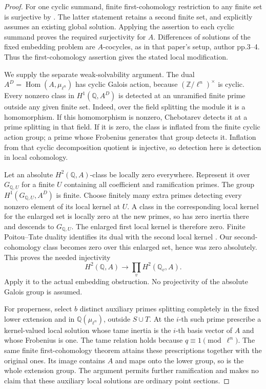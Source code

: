 \begin{proof}
For one cyclic summand, finite first-cohomology restriction
to any finite set is surjective by
\citet[Theorem 2.1(e), author p.4; Corollary 2.3,
author p.6]{CohNeftin2013}. The latter statement retains
a second finite set, and explicitly assumes an existing
global solution. Applying the assertion to each cyclic
summand proves the required surjectivity for \(A\).
Differences of solutions of the fixed embedding problem
are \(A\)-cocycles, as in that paper's setup,
author pp.3--4. Thus the first-cohomology assertion gives
the stated local modification.

We supply the separate weak-solvability argument.
The dual \(A^D=\operatorname{Hom}(A,\mu_{\ell^n})\)
has cyclic Galois action, because
\((\mathbb Z/\ell^n)^\times\) is cyclic.
Every nonzero class in \(H^1(\mathbb Q,A^D)\)
is detected at an unramified finite prime outside any
given finite set. Indeed, over the field splitting
the module it is a homomorphism. If this homomorphism
is nonzero, Chebotarev detects it at a prime splitting
in that field. If it is zero, the class is inflated
from the finite cyclic action group; a prime whose
Frobenius generates that group detects it.
Inflation from that cyclic decomposition quotient is
injective, so detection here is detection in local
cohomology.

Let an absolute \(H^2(\mathbb Q,A)\)-class be locally
zero everywhere. Represent it over \(G_{\mathbb Q,U}\)
for a finite \(U\) containing all coefficient and
ramification primes. The group \(H^1(G_{\mathbb Q,U},A^D)\)
is finite. Choose finitely many extra primes detecting
every nonzero element of its local kernel at \(U\).
A class in the corresponding local kernel for the
enlarged set is locally zero at the new primes,
so has zero inertia there and descends to \(G_{\mathbb Q,U}\).
The enlarged first local kernel is therefore zero.
Finite Poitou--Tate duality identifies its dual with
the second local kernel
\citep[I.4.10]{CohMilneADT}. Our second-cohomology
class becomes zero over this enlarged set, hence was
zero absolutely. This proves the needed injectivity
\[
 H^2(\mathbb Q,A)\longrightarrow
                         \prod_v H^2(\mathbb Q_v,A).
\]
Apply it to the actual embedding obstruction. No
projectivity of the absolute Galois group is assumed.

For properness, select \(b\) distinct auxiliary primes
splitting completely in the fixed lower extension
and in \(\mathbb Q(\mu_{\ell^n})\), outside \(S\cup T\).
At the \(i\)-th such prime prescribe a kernel-valued
local solution whose tame inertia is the \(i\)-th
basis vector of \(A\) and whose Frobenius is one.
The tame relation holds because \(q\equiv1\pmod{\ell^n}\).
The same finite first-cohomology theorem attains these
prescriptions together with the original ones.
Its image contains \(A\) and maps onto the lower
group, so is the whole extension group.
The argument permits further ramification and makes
no claim that these auxiliary local solutions are
ordinary point sections.
\end{proof}


